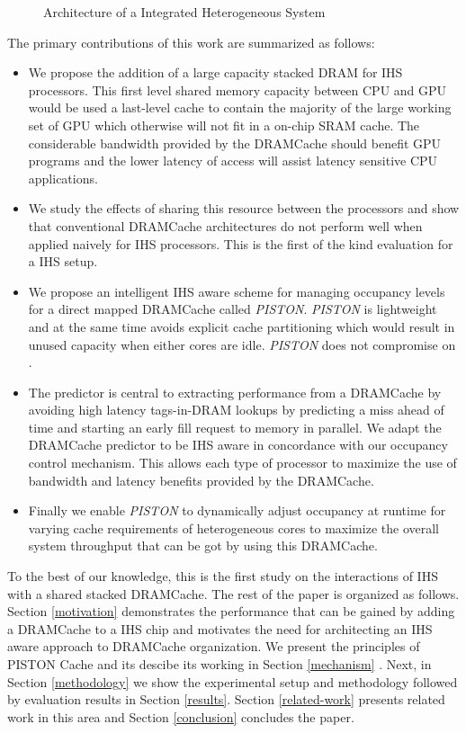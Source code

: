 
\begin{figure*}[!htb]
    \centering
    \hsacpu
    \caption{Architecture of a Integrated Heterogeneous System}
    \label{hsa-arch}
\end{figure*}
The primary contributions of this work are summarized as follows:

\begin{itemize}

\item We propose the addition of a large capacity stacked DRAM for IHS processors. This first level shared memory capacity between CPU and GPU would be used a last-level cache to contain the majority of the large working set of GPU which otherwise will not fit in a on-chip SRAM cache. The considerable bandwidth provided by the DRAMCache should benefit GPU programs and the lower latency of access will assist latency sensitive CPU applications. 
\item We study the effects of sharing this resource between the processors and show that conventional DRAMCache architectures do not perform well when applied naively for IHS processors. This is the first of the kind evaluation for a IHS setup.
\item We propose an intelligent IHS aware scheme for managing occupancy levels for a direct mapped DRAMCache called \textit{PISTON}. \textit{PISTON} is lightweight and at the same time avoids explicit cache partitioning which would result in unused capacity when either cores are idle. \textit{PISTON} does not compromise on .
\item The predictor is central to extracting performance from a DRAMCache by avoiding high latency tags-in-DRAM lookups by predicting a miss ahead of time and starting an early fill request to memory in parallel. We adapt the DRAMCache predictor to be IHS aware in concordance with our occupancy control mechanism. This allows each type of processor to maximize the use of bandwidth and latency benefits provided by the DRAMCache.
\item Finally we enable \textit{PISTON} to dynamically adjust occupancy at runtime for varying cache requirements of heterogeneous cores to maximize the overall system throughput that can be got by using this DRAMCache.

\end{itemize}
To the best of our knowledge, this is the first study on the interactions of IHS with a shared stacked DRAMCache. The rest of the paper is organized as follows. Section \ref{motivation} demonstrates the performance that can be gained by adding a DRAMCache to a IHS chip and motivates the need for architecting an IHS aware approach to DRAMCache organization. We present the principles of PISTON Cache and its descibe its working in Section \ref{mechanism} . Next, in Section \ref{methodology} we show the experimental setup and methodology followed by evaluation results in Section \ref{results}. Section \ref{related-work} presents related work in this area and Section \ref{conclusion} concludes the paper.
